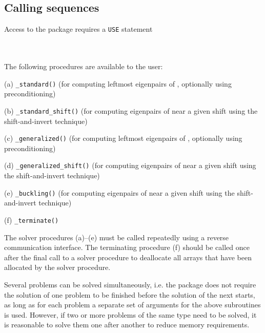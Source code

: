 \subsection{Calling sequences}

\label{sec:call}

Access to the package requires a {\tt USE} statement \\ \\
\indent\hspace{8mm}{\tt use \fullpackagename} \\

\medskip

\noindent The following procedures are available to the user:
%
\begin{description}
\vspace{-0.1cm}
\item (a) {\tt \solver\_standard()} 
(for computing leftmost eigenpairs of , 
optionally using preconditioning)
\item (b) {\tt \solver\_standard\_shift()} 
(for computing eigenpairs of  near a given shift %
using the shift-and-invert technique)
\item (c) {\tt \solver\_generalized()} 
(for computing leftmost eigenpairs of 
, optionally using preconditioning)
\item (d) {\tt \solver\_generalized\_shift()} 
(for computing eigenpairs of 
 near a given shift %
using the shift-and-invert technique)
\item (e) {\tt \solver\_buckling()} 
(for computing eigenpairs of 
 near a given shift %
using the shift-and-invert technique)
\item (f) {\tt \solver\_terminate()} 
%
\end{description}

The solver procedures (a)--(e)
must be called repeatedly using
a reverse communication interface.
The terminating procedure (f)
should be called once after the
final call to 
a solver procedure
to deallocate all arrays 
that have been allocated by %
the solver procedure.

Several problems can be solved simultaneously,
i.e. the package does not require the solution of
one problem to be finished before the solution of
the next starts, as long as for each problem a separate set
of arguments for the above subroutines is used.
However, if two or more problems of the same type
need to be solved, it is reasonable to solve them one
after another  to reduce  memory requirements.
\fi

